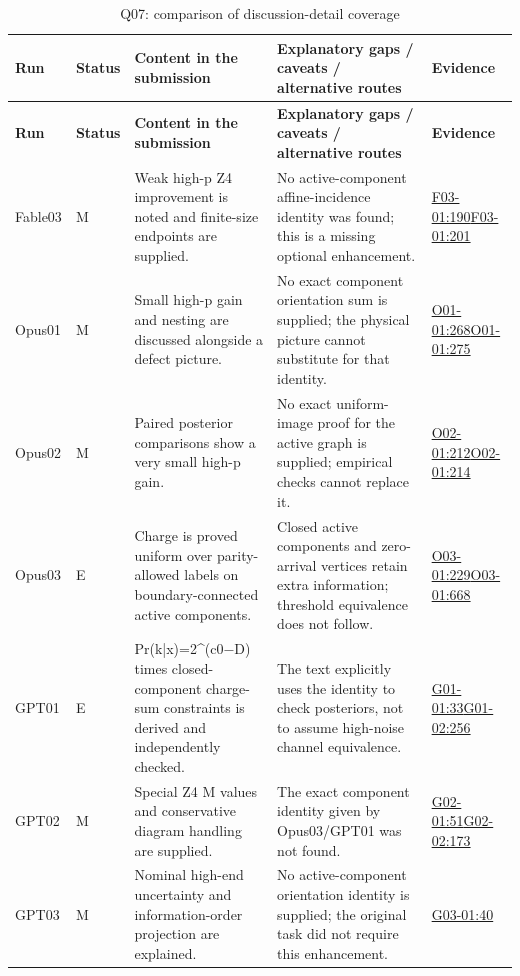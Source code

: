 \documentclass[11pt,a4paper]{article}
\begin{document}
{\fontsize{9.0}{12.6}\selectfont
\setlength{\tabcolsep}{2.5pt}
\begin{longtable}{>{\raggedright\arraybackslash}p{}>{\raggedright\arraybackslash}p{}>{\raggedright\arraybackslash}p{}>{\raggedright\arraybackslash}p{}>{\raggedright\arraybackslash}p{}}
\caption{Q07: comparison of discussion-detail coverage}\\
\toprule
\textbf{Run} & \textbf{Status} & \textbf{Content in the submission} & \textbf{Explanatory gaps /\allowbreak{} caveats /\allowbreak{} alternative routes} & \textbf{Evidence}\tabularnewline
\midrule
\endfirsthead
\toprule
\textbf{Run} & \textbf{Status} & \textbf{Content in the submission} & \textbf{Explanatory gaps /\allowbreak{} caveats /\allowbreak{} alternative routes} & \textbf{Evidence}\tabularnewline
\midrule
\endhead
{}Fable03 & M & Weak high-p Z4 improvement is noted and finite-size endpoints are supplied. & No active-component affine-incidence identity was found; this is a missing optional enhancement. & \hyperref[src:F03-01]{F03-01:190}\newline \hyperref[src:F03-01]{F03-01:201}\tabularnewline
{}Opus01 & M & Small high-p gain and nesting are discussed alongside a defect picture. & No exact component orientation sum is supplied; the physical picture cannot substitute for that identity. & \hyperref[src:O01-01]{O01-01:268}\newline \hyperref[src:O01-01]{O01-01:275}\tabularnewline
{}Opus02 & M & Paired posterior comparisons show a very small high-p gain. & No exact uniform-image proof for the active graph is supplied; empirical checks cannot replace it. & \hyperref[src:O02-01]{O02-01:212}\newline \hyperref[src:O02-01]{O02-01:214}\tabularnewline
{}Opus03 & E & Charge is proved uniform over parity-allowed labels on boundary-connected active components. & Closed active components and zero-arrival vertices retain extra information; threshold equivalence does not follow. & \hyperref[src:O03-01]{O03-01:229}\newline \hyperref[src:O03-01]{O03-01:668}\tabularnewline
{}GPT01 & E & Pr(k|x)=2\textasciicircum{}(c0\ensuremath{-}D) times closed-component charge-sum constraints is derived and independently checked. & The text explicitly uses the identity to check posteriors,\allowbreak{} not to assume high-noise channel equivalence. & \hyperref[src:G01-01]{G01-01:33}\newline \hyperref[src:G01-02]{G01-02:256}\tabularnewline
{}GPT02 & M & Special Z4 M values and conservative diagram handling are supplied. & The exact component identity given by Opus03/\allowbreak{}GPT01 was not found. & \hyperref[src:G02-01]{G02-01:51}\newline \hyperref[src:G02-02]{G02-02:173}\tabularnewline
{}GPT03 & M & Nominal high-end uncertainty and information-order projection are explained. & No active-component orientation identity is supplied; the original task did not require this enhancement. & \hyperref[src:G03-01]{G03-01:40}\tabularnewline
\bottomrule
\end{longtable}
}
\end{document}

